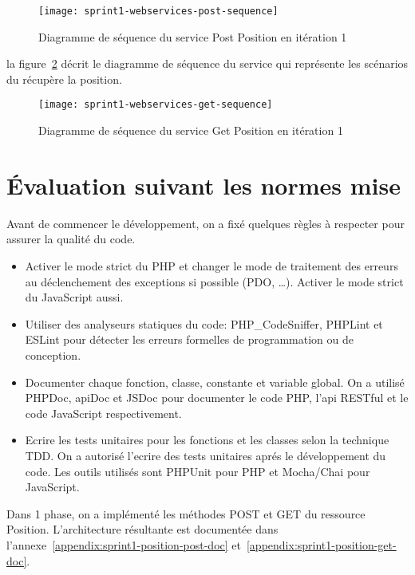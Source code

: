 \begin{figure}[htbp]
    \centering
    \texttt{[image: sprint1-webservices-post-sequence]}
    \caption{Diagramme de séquence du service Post Position en itération 1}
\label{fig:sprint1-webservices-post-sequence}
\end{figure}

la figure~\ref{fig:sprint1-webservices-get-sequence} décrit le diagramme de
séquence du service  qui représente les scénarios du
récupère la position.

\begin{figure}[htbp]
    \centering
    \texttt{[image: sprint1-webservices-get-sequence]}
    \caption{Diagramme de séquence du service Get Position en itération 1}
\label{fig:sprint1-webservices-get-sequence}
\end{figure}

\section{Évaluation suivant les normes mise}

Avant de commencer le développement, on a fixé quelques règles à respecter pour
assurer la qualité du code.

\begin{itemize}
    \item Activer le mode strict du PHP et changer le mode de traitement des
        erreurs au déclenchement des exceptions si possible (PDO, \ldots).
        Activer le mode strict du JavaScript aussi.
    \item Utiliser des analyseurs statiques du code: PHP\_CodeSniffer, PHPLint
        et ESLint pour détecter les erreurs formelles de programmation ou de
        conception.
    \item Documenter chaque fonction, classe, constante et variable global. On
        a utilisé PHPDoc, apiDoc et JSDoc pour documenter le code PHP, l'api
        RESTful et le code JavaScript respectivement.
    \item Ecrire les tests unitaires pour les fonctions et les classes selon la
        technique \acrshort{TDD}. On a autorisé l'ecrire des tests unitaires
        aprés le développement du code. Les outils utilisés sont PHPUnit pour
        PHP et Mocha/Chai pour JavaScript. 
\end{itemize}

Dans 1\ier{} phase, on a implémenté les méthodes POST et GET du ressource
Position. L'architecture résultante est documentée dans
l'annexe~\ref{appendix:sprint1-position-post-doc}
et~\ref{appendix:sprint1-position-get-doc}.


